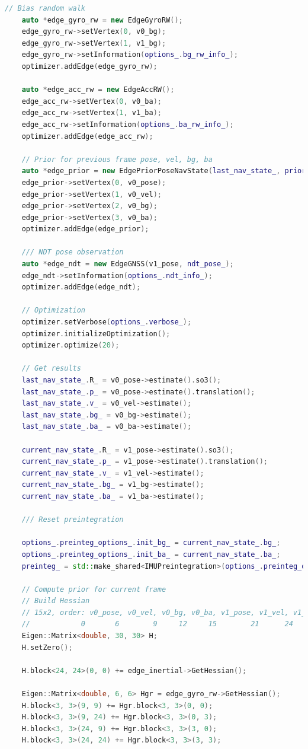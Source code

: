 \begin{lstlisting}[language=c++,caption=src/ch8/lio-preinteg/lio_preinteg.cc]
	// Bias random walk
	auto *edge_gyro_rw = new EdgeGyroRW();
	edge_gyro_rw->setVertex(0, v0_bg);
	edge_gyro_rw->setVertex(1, v1_bg);
	edge_gyro_rw->setInformation(options_.bg_rw_info_);
	optimizer.addEdge(edge_gyro_rw);
	
	auto *edge_acc_rw = new EdgeAccRW();
	edge_acc_rw->setVertex(0, v0_ba);
	edge_acc_rw->setVertex(1, v1_ba);
	edge_acc_rw->setInformation(options_.ba_rw_info_);
	optimizer.addEdge(edge_acc_rw);
	
	// Prior for previous frame pose, vel, bg, ba
	auto *edge_prior = new EdgePriorPoseNavState(last_nav_state_, prior_info_);
	edge_prior->setVertex(0, v0_pose);
	edge_prior->setVertex(1, v0_vel);
	edge_prior->setVertex(2, v0_bg);
	edge_prior->setVertex(3, v0_ba);
	optimizer.addEdge(edge_prior);
	
	/// NDT pose observation
	auto *edge_ndt = new EdgeGNSS(v1_pose, ndt_pose_);
	edge_ndt->setInformation(options_.ndt_info_);
	optimizer.addEdge(edge_ndt);
	
	// Optimization
	optimizer.setVerbose(options_.verbose_);
	optimizer.initializeOptimization();
	optimizer.optimize(20);
	
	// Get results
	last_nav_state_.R_ = v0_pose->estimate().so3();
	last_nav_state_.p_ = v0_pose->estimate().translation();
	last_nav_state_.v_ = v0_vel->estimate();
	last_nav_state_.bg_ = v0_bg->estimate();
	last_nav_state_.ba_ = v0_ba->estimate();
	
	current_nav_state_.R_ = v1_pose->estimate().so3();
	current_nav_state_.p_ = v1_pose->estimate().translation();
	current_nav_state_.v_ = v1_vel->estimate();
	current_nav_state_.bg_ = v1_bg->estimate();
	current_nav_state_.ba_ = v1_ba->estimate();
	
	/// Reset preintegration
	
	options_.preinteg_options_.init_bg_ = current_nav_state_.bg_;
	options_.preinteg_options_.init_ba_ = current_nav_state_.ba_;
	preinteg_ = std::make_shared<IMUPreintegration>(options_.preinteg_options_);
	
	// Compute prior for current frame
	// Build Hessian
	// 15x2, order: v0_pose, v0_vel, v0_bg, v0_ba, v1_pose, v1_vel, v1_bg, v1_ba
	//            0       6        9     12     15        21      24     27
	Eigen::Matrix<double, 30, 30> H;
	H.setZero();
	
	H.block<24, 24>(0, 0) += edge_inertial->GetHessian();
	
	Eigen::Matrix<double, 6, 6> Hgr = edge_gyro_rw->GetHessian();
	H.block<3, 3>(9, 9) += Hgr.block<3, 3>(0, 0);
	H.block<3, 3>(9, 24) += Hgr.block<3, 3>(0, 3);
	H.block<3, 3>(24, 9) += Hgr.block<3, 3>(3, 0);
	H.block<3, 3>(24, 24) += Hgr.block<3, 3>(3, 3);
	

\end{lstlisting}
